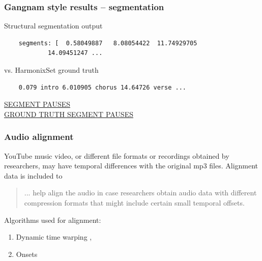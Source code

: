 \documentclass{beamer}
\begin{document}

\begin{frame}[fragile]
	\frametitle{Gangnam style results -- segmentation}
	Structural segmentation output
	\begin{verbatim}
	segments: [  0.58049887   8.08054422  11.74929705 
            14.09451247 ...
	\end{verbatim}
	vs. HarmonixSet ground truth
	\begin{verbatim}
	0.079 intro 6.010905 chorus 14.64726 verse ...
	\end{verbatim}
	\href{run:./gangnam_segments.wav}{SEGMENT PAUSES}\\
	\href{run:./gangnam_segments_truth.wav}{GROUND TRUTH SEGMENT PAUSES}
\end{frame}


\begin{frame}
	\frametitle{Audio alignment}
	YouTube music video, or different file formats or recordings obtained by researchers, may have temporal differences with the original mp3 files. Alignment data is included to
	\begin{quote}
	... help align the audio in case researchers obtain audio data with different compression formats that might include certain small temporal offsets.
	\end{quote}
	Algorithms used for alignment:
	\begin{enumerate}
		\item
			Dynamic time warping , 
		\item
			Onsets 
	\end{enumerate}
\end{frame}

\end{document}
